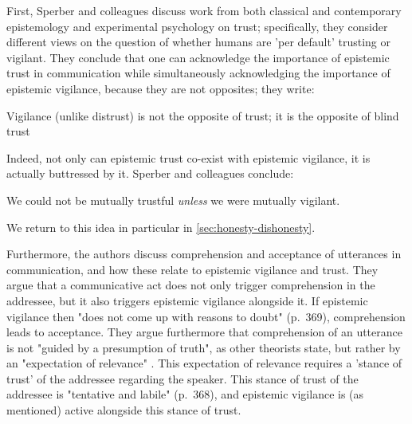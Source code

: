 First, Sperber and colleagues discuss work from both classical and contemporary epistemology and experimental psychology on trust; specifically, they consider different views on the question of whether humans are 'per default' trusting or vigilant. They conclude that one can acknowledge the importance of epistemic trust in communication while simultaneously acknowledging the importance of epistemic vigilance, because they are not opposites; they write:
\begin{quoting}
    Vigilance (unlike distrust) is not the opposite of trust; it is the opposite
of blind trust
  \hfill \citep[p.~363]{Sperber10}
\end{quoting}
Indeed, not only can epistemic trust co-exist with epistemic vigilance, it is actually buttressed by it. Sperber and colleagues conclude:
\begin{quoting}
    We could not be mutually trustful \emph{unless} we were mutually vigilant.
\end{quoting}
We return to this idea in particular in \cref{sec:honesty-dishonesty}.

Furthermore, the authors discuss comprehension and acceptance of utterances in communication, and how these relate to epistemic vigilance and trust.
They argue that a communicative act does not only trigger comprehension in the addressee, but it also triggers epistemic vigilance alongside it. If epistemic vigilance then "does not come up with reasons to doubt" (p.~369), comprehension leads to acceptance.
They argue furthermore that comprehension of an utterance is not "guided by a presumption of truth", as other theorists state, but rather by an "expectation of relevance" \citep[p.~367; see][]{SperberWilson86}. This expectation of relevance requires a 'stance of trust' of the addressee regarding the speaker.
This stance of trust of the addressee is "tentative and labile" (p.~368), and epistemic vigilance is (as mentioned) active alongside this stance of trust.


